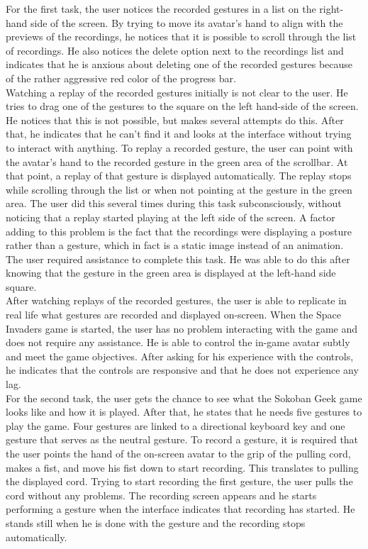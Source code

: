For the first task, the user notices the recorded gestures in a list on the right-hand side of the screen. By trying to move its avatar's hand to align with the previews of the recordings, he notices that it is possible to scroll through the list of recordings. He also notices the delete option next to the recordings list and indicates that he is anxious about deleting one of the recorded gestures because of the rather aggressive red color of the progress bar.\\

Watching a replay of the recorded gestures initially is not clear to the user. He tries to drag one of the gestures to the square on the left hand-side of the screen. He notices that this is not possible, but makes several attempts do this. After that, he indicates that he can't find it and looks at the interface without trying to interact with anything. To replay a recorded gesture, the user can point with the avatar's hand to the recorded gesture in the green area of the scrollbar. At that point, a replay of that gesture is displayed automatically. The replay stops while scrolling through the list or when not pointing at the gesture in the green area. The user did this several times during this task subconsciously, without noticing that a replay started playing at the left side of the screen. A factor adding to this problem is the fact that the recordings were displaying a posture rather than a gesture, which in fact is a static image instead of an animation. The user required assistance to complete this task. He was able to do this after knowing that the gesture in the green area is displayed at the left-hand side square.\\

After watching replays of the recorded gestures, the user is able to replicate in real life what gestures are recorded and displayed on-screen. When the Space Invaders game is started, the user has no problem interacting with the game and does not require any assistance. He is able to control the in-game avatar subtly and meet the game objectives. After asking for his experience with the controls, he indicates that the controls are responsive and that he does not experience any lag.\\

For the second task, the user gets the chance to see what the Sokoban Geek game looks like and how it is played. After that, he states that he needs five gestures to play the game. Four gestures are linked to a directional keyboard key and one gesture that serves as the neutral gesture. To record a gesture, it is required that the user points the hand of the on-screen avatar to the grip of the pulling cord, makes a fist, and move his fist down to start recording. This translates to pulling the displayed cord. Trying to start recording the first gesture, the user pulls the cord without any problems. The recording screen appears and he starts performing a gesture when the interface indicates that recording has started. He stands still when he is done with the gesture and the recording stops automatically.\\

